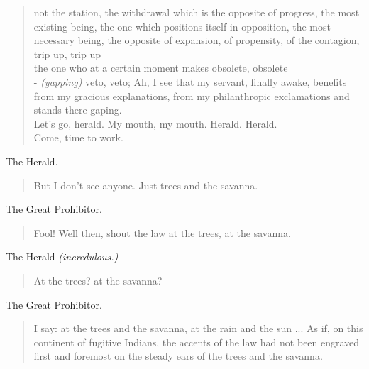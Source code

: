 \documentclass[letterpaper,article,12pt,oneside,notitlepage]{memoir}
\begin{document}
\begin{verse}
not the station, the withdrawal which is the opposite of progress, the most existing being, the one which positions itself in opposition, the most necessary being, the opposite of expansion, of propensity, of the contagion, trip up, trip up \\
the one who at a certain moment makes obsolete, obsolete \\
- \textit{(yapping)} veto, veto;
Ah, I see that my servant, finally awake, benefits from my gracious explanations, from my philanthropic exclamations and stands there gaping. \\
Let's go, herald. My mouth, my mouth. Herald. Herald. \\
Come, time to work. \\
\end{verse}

\begin{center}The Herald.\end{center}

\begin{verse}
But I don't see anyone. Just trees and the savanna. \\
\end{verse}

\begin{center}The Great Prohibitor.\end{center}

\begin{verse}
Fool! Well then, shout the law at the trees, at the savanna. \\
\end{verse}

\begin{center}The Herald  \textit{(incredulous.)}\end{center}

\begin{verse}
\hspace{1cm} At the trees? at the savanna? \\
\end{verse}

\begin{center}The Great Prohibitor.\end{center}

\begin{verse}
I say: at the trees and the savanna, at the rain and the sun ... As if, on this continent of fugitive Indians, the accents of the law had not been engraved first and foremost on the steady ears of the trees and the savanna.  \\
\end{verse}
\end{document}
